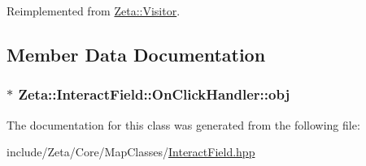 Reimplemented from \hyperlink{classZeta_1_1Visitor_ad7030244adc72eaafdd98ebaade80a71}{Zeta\+::\+Visitor}.



\subsection{Member Data Documentation}
\hypertarget{classZeta_1_1InteractField_1_1OnClickHandler_a3e784e284713db71a1d20090231f73d1}{
\subsubsection[{obj}]{$\ast$ Zeta\+::\+Interact\+Field\+::\+On\+Click\+Handler\+::obj\hspace{0.3cm}{\ttfamily [private]}}}\label{classZeta_1_1InteractField_1_1OnClickHandler_a3e784e284713db71a1d20090231f73d1}


The documentation for this class was generated from the following file\+:\begin{DoxyCompactItemize}
\item 
include/\+Zeta/\+Core/\+Map\+Classes/\hyperlink{InteractField_8hpp}{Interact\+Field.\+hpp}\end{DoxyCompactItemize}
